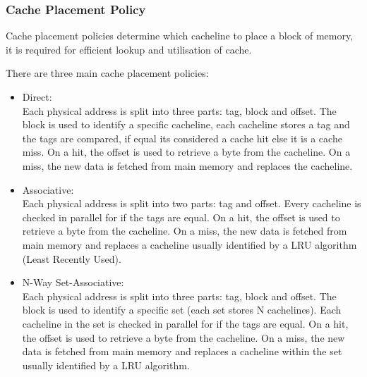 \documentclass{article}
\newcommand{\layout}[1]{\parbox{\linewidth}{#1}}
\begin{document}
\layout{
  \subsubsection{Cache Placement Policy}

  Cache placement policies determine which cacheline to place a block of memory, it is required for efficient lookup and utilisation of cache.
} \bigskip

\layout{
  There are three main cache placement policies:
  \begin{itemize}
    \item Direct: \\
      Each physical address is split into three parts: tag, block and offset.
      The block is used to identify a specific cacheline, each cacheline stores a tag and the tags are compared, if equal its considered a cache hit else it is a cache miss.
      On a hit, the offset is used to retrieve a byte from the cacheline.
      On a miss, the new data is fetched from main memory and replaces the cacheline.
    \item Associative: \\
      Each physical address is split into two parts: tag and offset.
      Every cacheline is checked in parallel for if the tags are equal.
      On a hit, the offset is used to retrieve a byte from the cacheline.
      On a miss, the new data is fetched from main memory and replaces a cacheline usually identified by a LRU algorithm (Least Recently Used).
    \item N-Way Set-Associative: \\
      Each physical address is split into three parts: tag, block and offset.
      The block is used to identify a specific set (each set stores N cachelines).
      Each cacheline in the set is checked in parallel for if the tags are equal.
      On a hit, the offset is used to retrieve a byte from the cacheline.
      On a miss, the new data is fetched from main memory and replaces a cacheline within the set usually identified by a LRU algorithm.
  \end{itemize}
}
\end{document}
